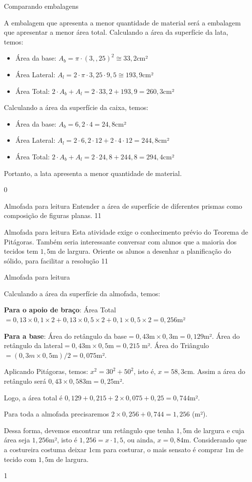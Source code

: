 \begin{answer}{Comparando embalagens}
{
A embalagem que apresenta a menor quantidade de material será a embalagem que apresentar a menor área total. Calculando a área da superfície da lata, temos:
\begin{itemize}
\item Área da base: $A_b=\pi\cdot(3,{,}25)^2\cong33{,}2$cm²  
\item Área Lateral: $A_l=2\cdot\pi\cdot3{,}25\cdot9,5\cong193,9$cm²
\item Área Total: $2\cdot A_b+A_l=2\cdot33{,}2+193{,}9=260{,}3$cm²
\end{itemize}

Calculando a área da superfície da caixa, temos:
\begin{itemize}
\item Área da base: $A_b=6{,}2\cdot4=24{,}8$cm²
\item Área Lateral: $A_l=2\cdot6{,}2\cdot12+2\cdot4\cdot12=244{,}8$cm²
\item Área Total: $2\cdot A_b+A_l=2\cdot24{,}8+244{,}8=294{,}4$cm²
\end{itemize}
Portanto, a lata apresenta a menor quantidade de material.
}{0}
\end{answer}
\begin{objectives}{Almofada para leitura}
{
Entender a área de superfície de diferentes prismas como composição de figuras planas. 
}{1}{1}
\end{objectives}
\begin{sugestions}{Almofada para leitura}
{
Esta atividade exige o conhecimento prévio do Teorema de Pitágoras. Também seria interessante conversar com alunos que a maioria dos tecidos tem $1{,}5$m de largura. Oriente os alunos a desenhar a planificação do sólido, para facilitar a resolução
}{1}{1}
\end{sugestions}
\clearmargin
\begin{answer}{Almofada para leitura}
{
Calculando a área da superfície da almofada, temos:

\textbf{Para o apoio de braço}: Área Total$=0{,}13\times0{,}1\times2+ 0{,}13\times 0{,}5 \times 2 + 0{,}1 \times 0{,}5 \times 2= 0{,}256$m²

\textbf{Para a base}: Área do retângulo da base$=0{,}43 \text{m} \times 0{,}3 \text{m} = 0{,}129$m². Área do retângulo da lateral$=0{,}43 \text{m} \times 0{,}5 \text{m} = 0{,}215$ m². Área do Triângulo $= (0{,}3 m \times 0{,}5 \text{m}) / 2=0{,}075$m².

Aplicando Pitágoras, temos: $x^2 = 30^2 + 50^2$, isto é, $x=58{,}3$cm. Assim a área do retângulo será $0{,}43\times0{,}583 \text{m}=0{,}25$m².

Logo, a área total é $0{,}129 + 0{,}215 + 2 \times 0{,}075 +0{,}25 = 0{,}744$m².

Para toda a almofada precisaremos $2 \times 0{,}256 + 0{,}744 = 1{,}256$ (m²).

Dessa forma, devemos encontrar um retângulo que tenha $1{,}5$m de largura e cuja área seja $1{,}256$m², isto é $1,256= x\cdot1{,}5$, ou ainda, $x=0{,}84$m. Considerando que a costureira costuma deixar $1$cm para costurar, o mais sensato é comprar $1$m de tecido com $1{,}5$m de largura.

}{1}
\end{answer}
